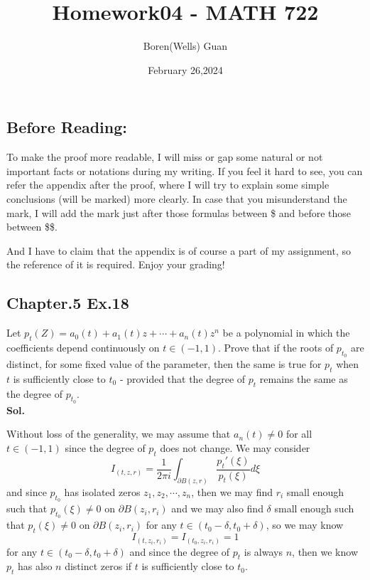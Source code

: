 \documentclass[lang=en,11pt,a4paper,citestyle =authoryear]{elegantpaper}
\title{Homework04 - MATH 722}
\author{Boren(Wells) Guan}
\date{February 26,2024}
\begin{document}
\maketitle

\subsection*{Before Reading:}\par
To make the proof more readable, I will miss or gap some natural or not important facts or notations during my writing. If you feel it hard to see, you can refer the appendix after the proof, where I will try to explain some simple conclusions (will be marked) more clearly. In case that you misunderstand the mark, I will add the mark just after those formulas between \$ and before those between \$\$.\par
And I have to claim that the appendix is of course a part of my assignment, so the reference of it is required. Enjoy your grading!

\subsection*{Chapter.5 Ex.18} 
Let $p_t(Z) = a_0(t)+a_1(t)z+\cdots+a_n(t)z^n$ be a polynomial in which the coefficients depend continuously on $t\in(-1,1)$. Prove that if the roots of $p_{t_0}$ are distinct, for some fixed value of the parameter, then the same is true for $p_t$ when $t$ is sufficiently close to $t_0$ - provided that the degree of $p_t$ remains the same as the degree of $p_{t_0}$.
\vspace{0.5em}\\
\textbf{Sol.} \par
Without loss of the generality, we may assume that $a_n(t)\neq 0$ for all $t\in (-1,1)$ since the degree of $p_t$ does not change. We may consider
\[
I_{(t,z,r)} = \dfrac{1}{2\pi i}\int_{\partial B(z,r)} \dfrac{p_t'(\xi)}{p_t(\xi)}d\xi 
\]
and since $p_{t_0}$ has isolated zeros $z_1,z_2,\cdots,z_n$, then we may find $r_i$ small enough such that $p_{t_0}(\xi) \neq 0$ on $\partial B(z_i,r_i)$ and we may also find $\delta$ small enough such that $p_t(\xi)\neq 0$ on $\partial B(z_i,r_i)$ for any $t\in(t_0-\delta,t_0+\delta)$, so we may know
\[
I_{(t,z_i,r_i)} = I_{(t_0,z_i,r_i)} = 1
\] 
for any $t\in (t_0-\delta,t_0+\delta)$ and since the degree of $p_t$ is always $n$, then we know $p_t$ has also $n$ distinct zeros if $t$ is sufficiently close to $t_0$.
\vspace{0.5em}
\end{document}
